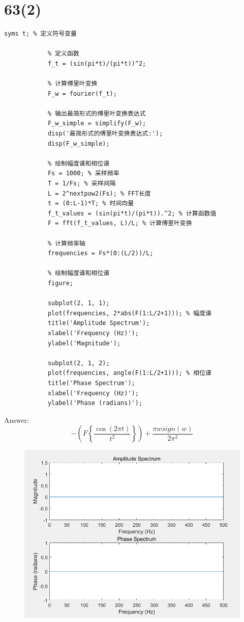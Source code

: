 \documentclass{article}
\begin{document}
    \section*{63(2)}
        \begin{lstlisting}[caption={题63(2)MATLAB代码}, label={lst:matlab}]
            syms t; % 定义符号变量

            % 定义函数
            f_t = (sin(pi*t)/(pi*t))^2;

            % 计算傅里叶变换
            F_w = fourier(f_t);

            % 输出最简形式的傅里叶变换表达式
            F_w_simple = simplify(F_w);
            disp('最简形式的傅里叶变换表达式:');
            disp(F_w_simple);

            % 绘制幅度谱和相位谱
            Fs = 1000; % 采样频率
            T = 1/Fs; % 采样间隔
            L = 2^nextpow2(Fs); % FFT长度
            t = (0:L-1)*T; % 时间向量
            f_t_values = (sin(pi*t)/(pi*t)).^2; % 计算函数值
            F = fft(f_t_values, L)/L; % 计算傅里叶变换

            % 计算频率轴
            frequencies = Fs*(0:(L/2))/L;

            % 绘制幅度谱和相位谱
            figure;

            subplot(2, 1, 1);
            plot(frequencies, 2*abs(F(1:L/2+1))); % 幅度谱
            title('Amplitude Spectrum');
            xlabel('Frequency (Hz)');
            ylabel('Magnitude');

            subplot(2, 1, 2);
            plot(frequencies, angle(F(1:L/2+1))); % 相位谱
            title('Phase Spectrum');
            xlabel('Frequency (Hz)');
            ylabel('Phase (radians)');

        \end{lstlisting}
        Answer: \[ - \left( {F\left\{ {\frac{{\cos \left( {2\pi t} \right)}}{{{t^2}}}} \right\}} \right) + \frac{{\pi wsign\left( w \right)}}{{2{\pi ^2}}}\]
            \begin{figure}[h]
                \includegraphics{63_2.png}
            \end{figure}
            \FloatBarrier
\end{document}
